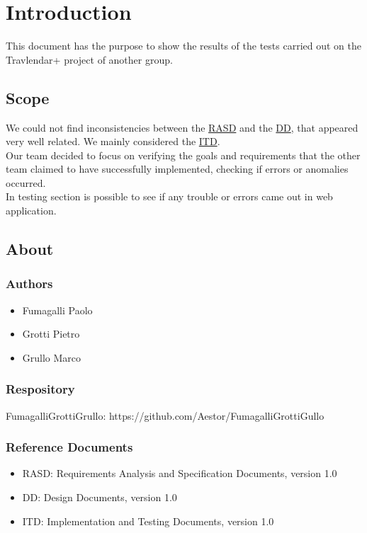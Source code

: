 \chapter{Introduction}
\label{cha:intro}

This document has the purpose to show the results of the tests carried out on the Travlendar+ project of another group.

\section{Scope}
We could not find inconsistencies between the \href{https://github.com/Aestor/FumagalliGrottiGullo/blob/master/DeliveryFolder/RASD.pdf}{RASD} and the \href{https://github.com/Aestor/FumagalliGrottiGullo/blob/master/DeliveryFolder/DD1.pdf}{DD}, that appeared very well related. We mainly considered the \href{https://github.com/Aestor/FumagalliGrottiGullo/blob/master/DeliveryFolder/ITD1.pdf}{ITD}.\\Our team decided to focus on verifying the goals and requirements that the other team claimed to have successfully implemented, checking if errors or anomalies occurred.\\In testing section is possible to see if any trouble or errors came out in web application.

\section{About}
\label{sec:about}
\subsection{Authors}
\begin{itemize}
\item Fumagalli Paolo
\item Grotti Pietro
\item Grullo Marco
\end{itemize}

\subsection{Respository}
FumagalliGrottiGrullo: https://github.com/Aestor/FumagalliGrottiGullo


\subsection{Reference Documents}
\begin{itemize}
\item RASD: Requirements Analysis and Specification Documents, version 1.0
\item DD: Design Documents, version 1.0
\item ITD: Implementation and Testing Documents, version 1.0
\end{itemize}